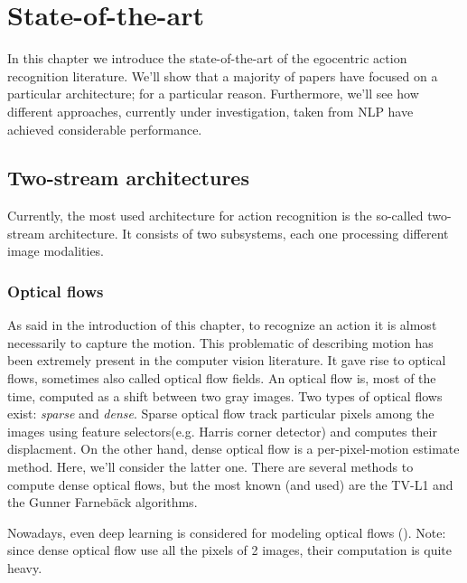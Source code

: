 \documentclass[12pt, a4paper]{report}
\begin{document}
		\section{State-of-the-art}\label{stateoftheart}
			In this chapter we introduce the state-of-the-art of the egocentric action recognition literature.
			We'll show that a majority of papers have focused on a particular architecture; for a particular reason.
			Furthermore, we'll see how different approaches, currently under investigation, taken from NLP have achieved considerable performance.
			
			\subsection{Two-stream architectures}\label{twostream}
				Currently, the most used architecture for action recognition is the so-called two-stream architecture.
				It consists of two subsystems, each one processing different image modalities.

				\subsubsection{Optical flows}
				As said in the introduction of this chapter, to recognize an action it is almost necessarily to capture the motion.
				This problematic of describing motion has been extremely present in the computer vision literature.
				It gave rise to optical flows, sometimes also called optical flow fields.
				An optical flow is, most of the time, computed as a shift between two gray images.
				Two types of optical flows exist: {\itshape sparse} and {\itshape dense}.
				Sparse optical flow track particular pixels among the images using feature selectors(e.g. Harris corner detector) and computes their displacment.
				On the other hand, dense optical flow is a per-pixel-motion estimate method.
				Here, we'll consider the latter one.
				There are several methods to compute dense optical flows, but the most known (and used) are the TV-L1 \cite{sanchez} and the Gunner Farnebäck \cite{farneback} algorithms.\par
				Nowadays, even deep learning is considered for modeling optical flows (\cite{hur}).
				Note: since dense optical flow use all the pixels of 2 images, their computation is quite heavy.
\end{document}
